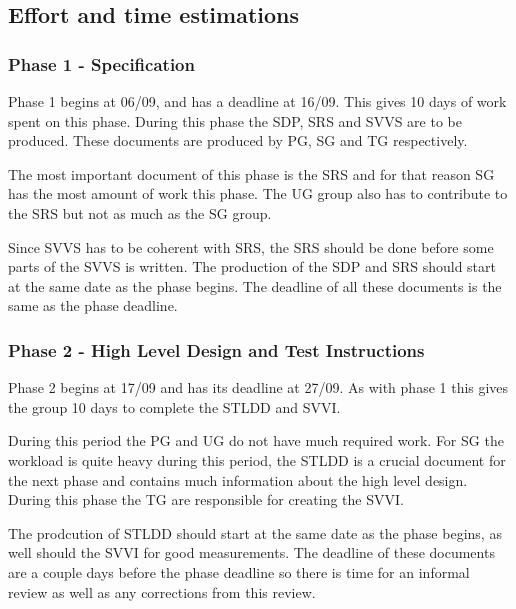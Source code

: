 \documentclass{article}
\begin{document}
\subsection{Effort and time estimations}

\subsubsection{Phase 1 - Specification}
Phase 1 begins at 06/09, and has a deadline at 16/09. This gives 10 days of work spent on this phase. During this phase the SDP, SRS and SVVS are to be produced. These documents are produced by PG, SG and TG respectively. 

The most important document of this phase is the SRS and for that reason SG has the most amount of work this phase. The UG group also has to contribute to the SRS but not as much as the SG group. 

Since SVVS has to be coherent with SRS, the SRS should be done before some parts of the SVVS is written. The production of the SDP and SRS should start at the same date as the phase begins. The deadline of all these documents is the same as the phase deadline. 


\subsubsection{Phase 2 - High Level Design and Test Instructions} Phase 2 begins at 17/09 and has its deadline at 27/09. As with phase 1 this gives the group 10 days to complete the STLDD and SVVI.  

During this period the PG and UG do not have much required work. For SG the workload is quite heavy during this period, the STLDD is a crucial document for the next phase and contains much information about the high level design. During this phase the TG are responsible for creating the SVVI.

The prodcution of STLDD should start at the same date as the phase begins, as well should the SVVI for good measurements. The deadline of these documents are a couple days before the phase deadline so there is time for an informal review as well as any corrections from this review.
\end{document}
